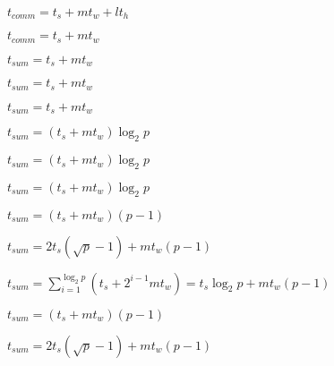 \documentclass[10pt]{book}
\begin{document}
\begin{mdSnippets}
\begin{mdInlineSnippet}%
$t_{comm} = t_s + mt_w+ lt_h$\end{mdInlineSnippet}%
\begin{mdInlineSnippet}%
$t_{comm} = t_s + mt_w$\end{mdInlineSnippet}%
\begin{mdInlineSnippet}[10819d45a6f11b738122f5fb8de9b0d8]%
$t_{sum} = t_s + mt_w$\end{mdInlineSnippet}%
\begin{mdInlineSnippet}[10819d45a6f11b738122f5fb8de9b0d8]%
$t_{sum} = t_s + mt_w$\end{mdInlineSnippet}%
\begin{mdInlineSnippet}[10819d45a6f11b738122f5fb8de9b0d8]%
$t_{sum} = t_s + mt_w$\end{mdInlineSnippet}%
\begin{mdInlineSnippet}%
$t_{sum} = (t_s + mt_w) \log _2 p$\end{mdInlineSnippet}%
\begin{mdInlineSnippet}%
$t_{sum} = (t_s + mt_w) \log _2 p$\end{mdInlineSnippet}%
\begin{mdInlineSnippet}%
$t_{sum} = (t_s + mt_w) \log _2 p$\end{mdInlineSnippet}%
\begin{mdInlineSnippet}[76ecbdcc60db753d50e0f54442684a1f]%
$t_{sum} = (t_s + mt_w)(p - 1)$\end{mdInlineSnippet}%
\begin{mdInlineSnippet}[9f1e04740609c172e554c5544a2e4175]%
$t_{sum} = 2t_s(\sqrt {p} - 1) + mt_w(p  - 1)$\end{mdInlineSnippet}%
\begin{mdInlineSnippet}[5fcdb7921e3375087998ee90d7e33503]%
$t_{sum} = \sum^{\log _2 p}_{i=1}{(t_s+2^{i - 1}m{t_w})} = t_s{\log _2 p} + mt_w(p - 1)$\end{mdInlineSnippet}%
\begin{mdInlineSnippet}[76ecbdcc60db753d50e0f54442684a1f]%
$t_{sum} = (t_s + mt_w)(p - 1)$\end{mdInlineSnippet}%
\begin{mdInlineSnippet}[9f1e04740609c172e554c5544a2e4175]%
$t_{sum} = 2t_s(\sqrt {p} - 1) + mt_w(p  - 1)$\end{mdInlineSnippet}%
\begin{mdInlineSnippet}[629f04eaaeb5a9b94dc3944fc5634bb4]%
$t_{sum} = {\sum^{\log _2 p}_{i=1}(t_s+2^{i - 1}m{t_w})$\end{mdInlineSnippet}%

\end{mdSnippets}
\end{document}
